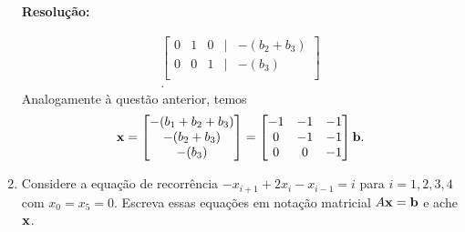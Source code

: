 \documentclass[leqno]{article}
\newenvironment{sol}
{
    \vspace{4mm}
    \noindent\textbf{Resolução:}
    \strut\newline
    \smallskip
    \hspace{-3.5mm}
}
{}
\begin{document}
\begin{enumerate}
\begin{sol}
\begin{align*}
\begin{bmatrix}
        0  & 1 & 0  & \mid & - ( b_{ 2 } + b_{ 3 } ) \\
        0  & 0  & 1 & \mid & - ( b_{ 3 } ) \\
    \end{bmatrix} \\
    .\end{align*}
    Analogamente à questão anterior, temos
    \begin{equation*}
        \mathbf{x} =
        \begin{bmatrix}
            - ( b_{ 1 } + b_{ 2 } + b_{ 3 } ) \\
            - ( b_{ 2 } + b_{ 3 } ) \\
            - ( b_{ 3 } ) \\
        \end{bmatrix}
        =
        \begin{bmatrix}
            -1 & -1 & -1 \\
            0 & -1 & -1 \\
            0 & 0 & -1
        \end{bmatrix}
        \mathbf{b}
    .\end{equation*}
\end{sol}

\item Considere a equação de recorrência $-x_{i+1} + 2x_i - x_{i-1} = i$ para $i=1,2,3,4$ com $x_0 = x_5 = 0$. Escreva essas equações em notação matricial $A\mathbf{x} = \mathbf{b}$ e ache $\mathbf{x}$.


\end{enumerate}
\end{document}
